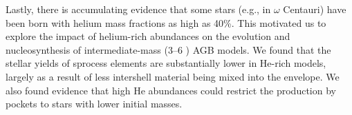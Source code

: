 Lastly, there is accumulating evidence that some stars (e.g., in $\omega$ Centauri) have been born with helium mass fractions as high as 40\%. This motivated us to explore the impact of helium-rich abundances on the evolution and nucleosynthesis of intermediate-mass (3--6 \Msun) \gls{AGB} models. We found that the stellar yields of \gls{sprocess} elements are substantially lower in He-rich models, largely as a result of less intershell material being mixed into the envelope. We also found evidence that high He abundances could restrict the \sprocess production by  pockets to stars with lower initial masses.

\glsresetall